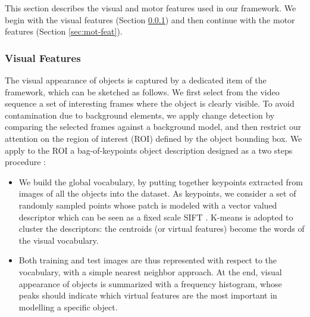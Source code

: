 This section describes the visual and motor features used in our framework. We begin with the visual features 
(Section \ref{sec:vis-feat}) and then continue with the motor features (Section \ref{sec:mot-feat}).

\subsubsection{Visual Features}
\label{sec:vis-feat}


The visual appearance of objects is captured by a dedicated item of the framework, %
which
can be sketched as follows.
We first select from the video sequence a set of interesting frames where the object is clearly visible. 
To avoid contamination due to background elements, 
we apply change detection by comparing the selected frames against a background model, and then
restrict our attention on the region of interest (ROI) defined by the object bounding box.
We apply to the ROI a bag-of-keypoints object description \cite{csurka-dance-2004} designed as a two steps procedure \cite{ICIAP}:

\begin{itemize}

\item  We build the global vocabulary, by putting together keypoints extracted from images of all 
the objects into the dataset. As keypoints, we consider a set of randomly sampled points whose 
patch is modeled with a vector valued  descriptor which can be seen as a fixed scale SIFT  \cite{lowe}.
K-means is adopted to cluster the descriptors: the centroids 
(or virtual features) become the words of the visual vocabulary.

\item Both training and test images are thus represented with respect to the vocabulary, with a simple 
nearest neighbor approach.  At the end, visual appearance of objects is summarized with a frequency 
histogram, whose peaks should indicate which virtual features are the most important in modelling a specific object.

\end{itemize}

